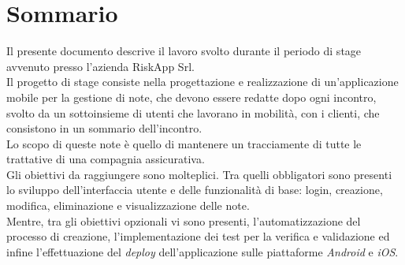 \cleardoublepage
{}
{}
\begingroup
\let\clearpage\relax
\let\cleardoublepage\relax
\let\cleardoublepage\relax

\chapter*{Sommario}

Il presente documento descrive il lavoro svolto durante il periodo di stage avvenuto presso l'azienda RiskApp Srl. \\

\noindent Il progetto di stage consiste nella progettazione e realizzazione di un'applicazione mobile per la gestione di note, che devono essere redatte dopo ogni incontro, svolto da un sottoinsieme di utenti che lavorano in mobilità, con i clienti, che consistono in un sommario dell'incontro.\\
Lo scopo di queste note è quello di mantenere un tracciamente di tutte le trattative di una compagnia assicurativa.\\


\noindent Gli obiettivi da raggiungere sono molteplici. Tra quelli obbligatori sono presenti lo sviluppo dell'interfaccia utente e delle funzionalità di base: login, creazione, modifica, eliminazione e visualizzazione delle note.\\
Mentre, tra gli obiettivi opzionali vi sono presenti, l'automatizzazione del processo di creazione, l'implementazione dei test per la verifica e validazione ed infine l'effettuazione del \emph{deploy} dell'applicazione sulle piattaforme \emph{Android} e \emph{iOS}.\\




\endgroup

\vfill
